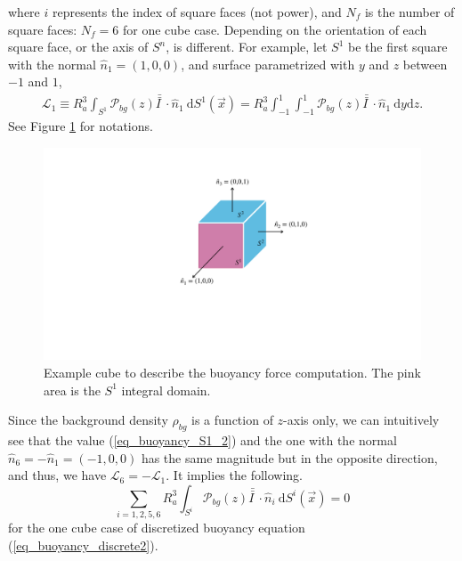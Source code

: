 where $i$ represents the index of square faces (not power), and $N_f$ is the number of square faces: $N_f = 6$ for one cube case. Depending on the orientation of each square face, or the axis of $S^n$, is different. For example, let $S^1$ be the first square with the normal $\hat{n}_1 = (1,0,0)$, and surface parametrized with $y$ and $z$ between $-1$ and $1$,
\begin{align}
	\mathcal{L}_1 \equiv 
	R_a^3 
	 \int_{S^1}
	 \mathcal{P}_{bg}(z) 
	  \bar{\bar{I \ }}  \cdot
	\hat{n}_1 \ \textrm{d}S^1 (\vec{x})
	= R_a^3  \int_{-1}^{1} \int_{-1}^{1}
	\mathcal{P}_{bg}(z) 
	\bar{\bar{I \ }}  \cdot
 	\hat{n}_1 \ 
	\textrm{d}y  \textrm{d}z.
\label{eq_buoyancy_S1_2}
\end{align}
See Figure \ref{fig_rho_bg_on_S1} for notations.
\begin{figure}[h]
	\begin{center}
		\includegraphics[scale=0.3]{./figures/fig_rho_bg_on_S1.pdf}
	\caption{Example cube to describe the buoyancy force computation. The pink area is the $S^1$ integral domain.}
	\label{fig_rho_bg_on_S1}
\end{center}
\end{figure}
Since the background density $\rho_{bg}$ is a function of $z$-axis only, we can intuitively see that the value (\ref{eq_buoyancy_S1_2}) and the one with the normal $\hat{n}_6 = -\hat{n}_1 = (-1,0,0)$ has the same magnitude but in the opposite direction, and thus, we have $\mathcal{L}_6 = -\mathcal{L}_1$. 
It implies the following.
\begin{equation}
	\sum_{i=1,2,5,6}
	 R_a^3 \int_{S^i} 
	 \mathcal{P}_{bg}(z) 
	 \bar{\bar{I \ }}  \cdot
	\hat{n}_i \ \textrm{d}S^i (\vec{x})
	 = 0
\label{eq_buoyancy_zero_oneCube}
\end{equation}
for the one cube case of discretized buoyancy equation (\ref{eq_buoyancy_discrete2}).

